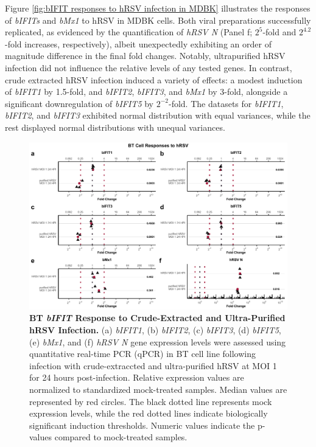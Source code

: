 Figure \ref{fig:bIFIT responses to hRSV infection in MDBK} illustrates the responses of \textit{bIFITs} and \textit{bMx1} to hRSV in MDBK cells. Both viral preparations successfully replicated, as evidenced by the quantification of \textit{hRSV N} (Panel f; \(2^{5}\)-fold and \(2^{4.2}\)-fold increases, respectively), albeit unexpectedly exhibiting an order of magnitude difference in the final fold changes. Notably, ultrapurified hRSV infection did not influence the relative levels of any tested genes. In contrast, crude extracted hRSV infection induced a variety of effects: a modest induction of \textit{bIFIT1} by 1.5-fold, and \textit{bIFIT2}, \textit{bIFIT3}, and \textit{bMx1} by 3-fold, alongside a significant downregulation of \textit{bIFIT5} by \(2^{-2}\)-fold. The datasets for \textit{bIFIT1}, \textit{bIFIT2}, and \textit{bIFIT3} exhibited normal distribution with equal variances, while the rest displayed normal distributions with unequal variances.

\begin{figure}
    \centering
    \includegraphics[width=1\linewidth]{07. Chapter 2/Figs/02. Induction/10. bt_hrsv.pdf}
    \caption[BT \textit{bIFIT} Response to Crude-Extracted and Ultra-Purified hRSV Infection.]{\textbf{BT \textit{bIFIT} Response to Crude-Extracted and Ultra-Purified hRSV Infection.} (a) \textit{bIFIT1}, (b) \textit{bIFIT2}, (c) \textit{bIFIT3}, (d) \textit{bIFIT5}, (e) \textit{bMx1}, and (f) \textit{hRSV N} gene expression levels were assessed using quantitative real-time PCR (qPCR) in BT cell line following infection with crude-extraccted and ultra-purified hRSV at MOI 1 for 24 hours post-infection. Relative expression values are normalized to standardized mock-treated samples. Median values are represented by red circles. The black dotted line represents mock expression levels, while the red dotted lines indicate biologically significant induction thresholds. Numeric values indicate the p-values compared to mock-treated samples.}
    \label{fig:Bt responses to hRSV}
\end{figure}

